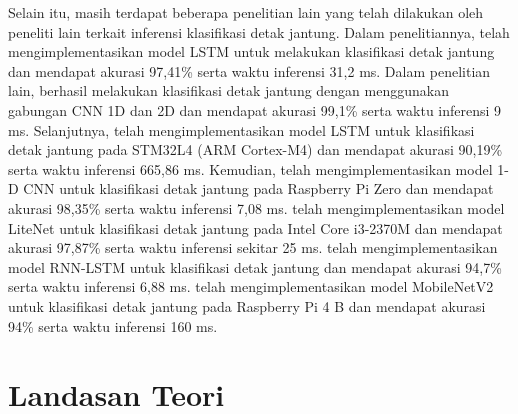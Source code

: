 %
%
%
%
Selain itu, masih terdapat beberapa penelitian lain yang telah dilakukan oleh peneliti lain terkait inferensi klasifikasi detak jantung.
Dalam penelitiannya, \textcite{saadatnejadLSTMBasedECGClassification2020} telah mengimplementasikan model LSTM untuk melakukan klasifikasi detak jantung dan mendapat akurasi 97,41\% serta waktu inferensi 31,2 ms.
Dalam penelitian lain, \textcite{9878113} berhasil melakukan klasifikasi detak jantung dengan menggunakan gabungan CNN 1D dan 2D dan mendapat akurasi 99,1\% serta waktu inferensi 9 ms.
Selanjutnya, \textcite{FALASCHETTI20223479} telah mengimplementasikan model LSTM untuk klasifikasi detak jantung pada STM32L4 (ARM Cortex-M4) dan mendapat akurasi 90,19\% serta waktu inferensi 665,86 ms.
Kemudian, \textcite{liEnablingOndeviceClassification2021} telah mengimplementasikan model 1-D CNN
untuk klasifikasi detak jantung
pada Raspberry Pi Zero dan mendapat akurasi 98,35\% serta waktu inferensi 7,08 ms.
\textcite{heLiteNetLightweightNeural2018} telah mengimplementasikan model LiteNet untuk klasifikasi detak jantung pada Intel Core i3-2370M dan mendapat akurasi 97,87\% serta waktu inferensi sekitar 25 ms.
\textcite{abayaratneRealTimeCardiacArrhythmia2019} telah mengimplementasikan model RNN-LSTM untuk klasifikasi detak jantung dan mendapat akurasi 94,7\% serta waktu inferensi 6,88 ms.
\textcite{mhamdiArtificialIntelligenceCardiac2022} telah mengimplementasikan model MobileNetV2 untuk klasifikasi detak jantung pada Raspberry Pi 4 B dan mendapat akurasi 94\% serta waktu inferensi 160 ms.


\section{Landasan Teori}




